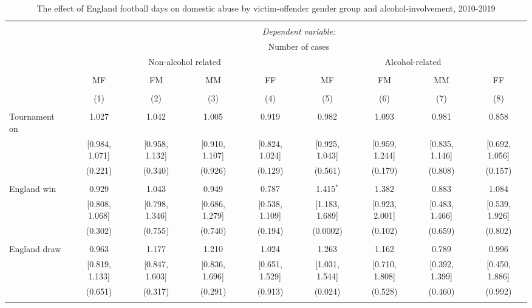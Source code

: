 \documentclass[12pt, a4paper]{article}
\begin{document}
\begin{table}
\centering
 \caption{The effect of England football days on domestic abuse by victim-offender gender group and alcohol-involvement, 2010-2019}
   \label{gender}
 \begin{threeparttable}
\begin{tabular}{@{\extracolsep{1pt}}lcccccccc} 
\\[-1.8ex]\hline 
\hline \\[-1.8ex] 
 & \multicolumn{8}{c}{\textit{Dependent variable:}} \\ 
   & \multicolumn{8}{c}{Number of cases} \\ 
  & \multicolumn{4}{c}{Non-alcohol related} &\multicolumn{4}{c}{Alcohol-related} \\ 
\cline{2-9} 
\\[-1.8ex] & MF & FM & MM & FF & MF & FM & MM & FF \\ 
\\[-1.8ex] & (1) & (2) & (3) & (4) & (5) & (6) & (7) & (8)\\ 
\hline \\[-1.8ex] 
 Tournament on & 1.027 & 1.042 & 1.005 & 0.919 & 0.982 & 1.093 & 0.981 & 0.858 \\ 
  & [0.984, 1.071] & [0.958, 1.132] & [0.910, 1.107] & [0.824, 1.024] & [0.925, 1.043] & [0.959, 1.244] & [0.835, 1.146] & [0.692, 1.056] \\ 
  & (0.221) & (0.340) & (0.926) & (0.129) & (0.561) & (0.179) & (0.808) & (0.157) \\ 
  & & & & & & & & \\ 
 England win & 0.929 & 1.043 & 0.949 & 0.787 & 1.415$^{*}$ & 1.382 & 0.883 & 1.084 \\ 
  & [0.808, 1.068] & [0.798, 1.346] & [0.686, 1.279] & [0.538, 1.109] & [1.183, 1.689] & [0.923, 2.001] & [0.483, 1.466] & [0.539, 1.926] \\ 
  & (0.302) & (0.755) & (0.740) & (0.194) & (0.0002) & (0.102) & (0.659) & (0.802) \\ 
  & & & & & & & & \\ 
 England draw & 0.963 & 1.177 & 1.210 & 1.024 & 1.263 & 1.162 & 0.789 & 0.996 \\ 
  & [0.819, 1.133] & [0.847, 1.603] & [0.836, 1.696] & [0.651, 1.529] & [1.031, 1.544] & [0.710, 1.808] & [0.392, 1.399] & [0.450, 1.886] \\ 
  & (0.651) & (0.317) & (0.291) & (0.913) & (0.024) & (0.528) & (0.460) & (0.992) \\ 
  & & & & & & & & \\ 

\end{tabular}
\end{threeparttable}
\end{table}
\end{document}
